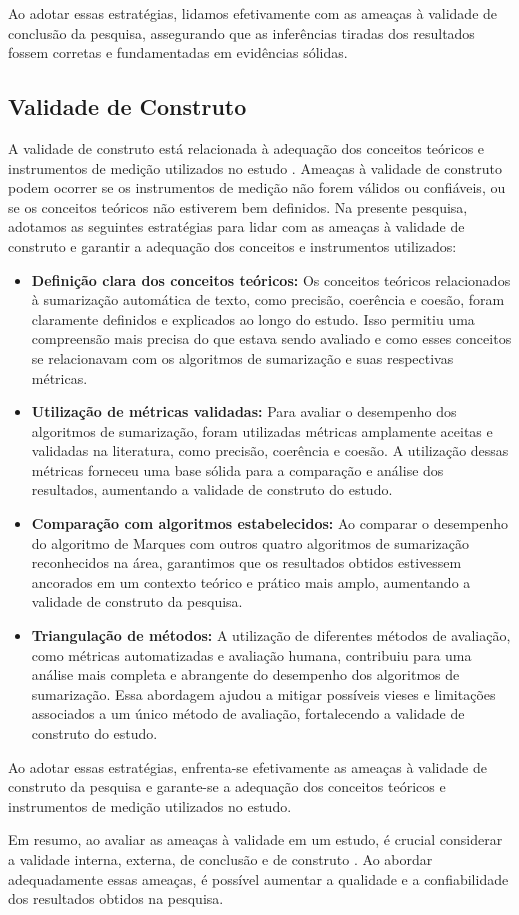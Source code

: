 Ao adotar essas estratégias, lidamos efetivamente com as ameaças à validade de conclusão da pesquisa, assegurando que as inferências tiradas dos resultados fossem corretas e fundamentadas em evidências sólidas.

\subsection{Validade de Construto}
A validade de construto está relacionada à adequação dos conceitos teóricos e instrumentos de medição utilizados no estudo \cite{cronbach1955construct}. Ameaças à validade de construto podem ocorrer se os instrumentos de medição não forem válidos ou confiáveis, ou se os conceitos teóricos não estiverem bem definidos. Na presente pesquisa, adotamos as seguintes estratégias para lidar com as ameaças à validade de construto e garantir a adequação dos conceitos e instrumentos utilizados:

\begin{itemize}
    \item \textbf{Definição clara dos conceitos teóricos:} Os conceitos teóricos relacionados à sumarização automática de texto, como precisão, coerência e coesão, foram claramente definidos e explicados ao longo do estudo. Isso permitiu uma compreensão mais precisa do que estava sendo avaliado e como esses conceitos se relacionavam com os algoritmos de sumarização e suas respectivas métricas.
    \item \textbf{Utilização de métricas validadas:} Para avaliar o desempenho dos algoritmos de sumarização, foram utilizadas métricas amplamente aceitas e validadas na literatura, como precisão, coerência e coesão. A utilização dessas métricas forneceu uma base sólida para a comparação e análise dos resultados, aumentando a validade de construto do estudo.
    \item \textbf{Comparação com algoritmos estabelecidos:} Ao comparar o desempenho do algoritmo de Marques com outros quatro algoritmos de sumarização reconhecidos na área, garantimos que os resultados obtidos estivessem ancorados em um contexto teórico e prático mais amplo, aumentando a validade de construto da pesquisa.
    \item \textbf{Triangulação de métodos:} A utilização de diferentes métodos de avaliação, como métricas automatizadas e avaliação humana, contribuiu para uma análise mais completa e abrangente do desempenho dos algoritmos de sumarização. Essa abordagem ajudou a mitigar possíveis vieses e limitações associados a um único método de avaliação, fortalecendo a validade de construto do estudo.
\end{itemize}

Ao adotar essas estratégias, enfrenta-se efetivamente as ameaças à validade de construto da pesquisa e garante-se a adequação dos conceitos teóricos e instrumentos de medição utilizados no estudo.

Em resumo, ao avaliar as ameaças à validade em um estudo, é crucial considerar a validade interna, 
externa, de conclusão e de construto \cite{cook1979quasi}. Ao abordar adequadamente essas ameaças, é possível aumentar a qualidade e a confiabilidade dos resultados obtidos na pesquisa.
